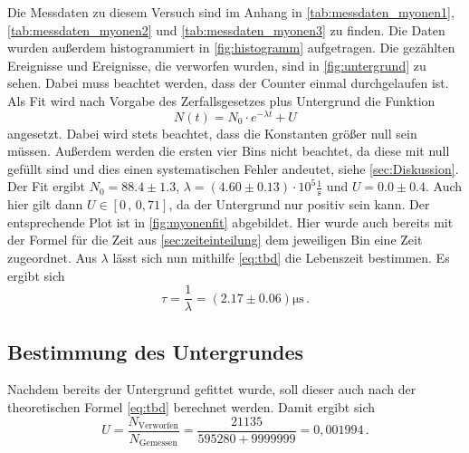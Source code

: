 Die Messdaten zu diesem Versuch sind im Anhang in \autoref{tab:messdaten_myonen1}, \autoref{tab:messdaten_myonen2} und \autoref{tab:messdaten_myonen3} zu finden.
Die Daten wurden außerdem histogrammiert in \autoref{fig:histogramm} aufgetragen.
Die gezählten Ereignisse und Ereignisse, die verworfen wurden, sind in \autoref{fig:untergrund} zu sehen.
Dabei muss beachtet werden, dass der Counter einmal durchgelaufen ist.
Als Fit wird nach Vorgabe des Zerfallsgesetzes plus Untergrund die Funktion
\begin{equation*}
    N(t) = N_0 \cdot e^{- \lambda t} + U
\end{equation*} 
angesetzt.
Dabei wird stets beachtet, dass die Konstanten größer null sein müssen.
Außerdem werden die ersten vier Bins nicht beachtet, da diese mit null gefüllt sind und dies einen systematischen Fehler andeutet, siehe \autoref{sec:Diskussion}.
Der Fit ergibt $N_0 = 88.4 \pm 1.3$, $\lambda = (4.60 \pm 0.13) \cdot 10^5 \frac{1}{\unit{\second}}$ und $U = 0.0 \pm 0.4$.
Auch hier gilt dann $U \in [0 \, , \, 0,71]$, da der Untergrund nur positiv sein kann.
Der entsprechende Plot ist in \autoref{fig:myonenfit} abgebildet.
Hier wurde auch bereits mit der Formel für die Zeit aus \autoref{sec:zeiteinteilung} dem jeweiligen Bin eine Zeit zugeordnet.
Aus $\lambda$ lässt sich nun mithilfe \autoref{eq:tbd} die Lebenszeit bestimmen.
Es ergibt sich
\begin{equation}
    \tau = \frac{1}{\lambda} = (2.17 \pm 0.06) \unit{\micro\second} \, .
\end{equation}

\subsection{Bestimmung des Untergrundes} \label{sec:untergrund_ausw}

Nachdem bereits der Untergrund gefittet wurde, soll dieser auch nach der theoretischen Formel \autoref{eq:tbd} berechnet werden.
Damit ergibt sich
\begin{equation*}
    U = \frac{N_\text{Verworfen}}{N_\text{Gemessen}} = \frac{21135}{595280 + 9999999} = 0,001994 \, .
\end{equation*} 